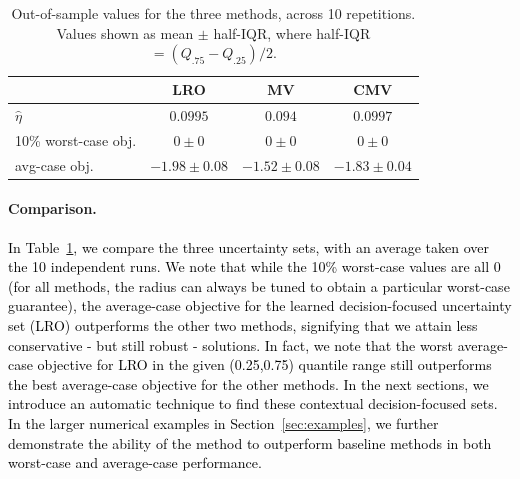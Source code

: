 \documentclass[11pt]{article}
\newcommand{\RC}[1]{\textcolor{black}{#1}}
\begin{document}
\begin{table}
\footnotesize
\centering
\begin{tabular}{lccc}
\toprule
 &  LRO & MV & CMV \\
\midrule
 $\hat{\eta}$ & $0.0995$ & $0.094$ & $0.0997$\\
 \midrule
 10\% worst-case obj. &  $0 \pm 0 $ &$0 \pm 0 $ &$0 \pm 0 $  \\
  \midrule
 avg-case obj. &$-1.98 \pm 0.08$ &   $-1.52 \pm 0.08$ &  $-1.83\pm 0.04$\\
\bottomrule
\end{tabular}
\caption{Out-of-sample values for the three methods, across 10 repetitions. Values shown as mean $\pm$ half-IQR, where half-IQR $= (Q_{.75} - Q_{.25})/2$.}
\label{tab:intro}
\end{table}

\paragraph{Comparison.}
\RC{In Table~\ref{tab:intro}, we compare the three uncertainty sets, with an average taken over the 10 independent runs. We note that while the 10\% worst-case values are all 0 (for all methods, the radius can always be tuned to obtain a particular worst-case guarantee), the average-case objective for the learned decision-focused uncertainty set (LRO) outperforms the other two methods, signifying that we attain less conservative - but still robust - solutions. In fact, we note that the worst average-case objective for LRO in the given (0.25,0.75) quantile range still outperforms the best average-case objective for the other methods.}
\RC{In the next sections, we introduce an automatic technique to find these contextual decision-focused sets. In the larger numerical examples in Section~\ref{sec:examples}, we further demonstrate the ability of the method to outperform baseline methods in both worst-case and average-case performance. }

\end{document}
